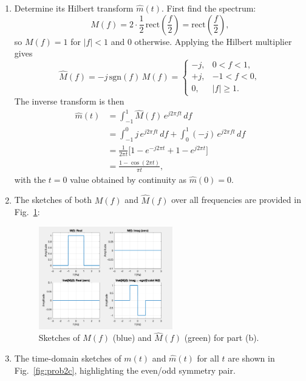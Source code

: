 \documentclass[12pt]{article}
\begin{document}
\begin{enumerate}[label=(\alph*)]
\item Determine its Hilbert transform \(\hat{m}(t)\). First find the spectrum:
\[
M(f) = 2 \cdot \frac{1}{2}\,\mathrm{rect}\!\left(\frac{f}{2}\right) = \mathrm{rect}\!\left(\frac{f}{2}\right),
\]
so \(M(f)=1\) for \(|f|<1\) and \(0\) otherwise. Applying the Hilbert multiplier gives
\[
\hat{M}(f) = -j\,\mathrm{sgn}(f)\,M(f) = 
\begin{cases}
-j, & 0 < f < 1, \\
+j, & -1 < f < 0, \\
0, & |f| \ge 1 .
\end{cases}
\]
The inverse transform is then
\begin{align*}
\hat{m}(t) &= \int_{-1}^{1} \hat{M}(f)\,e^{j2\pi ft}\,df \\
&= \int_{-1}^{0} j\,e^{j2\pi ft}\,df + \int_{0}^{1} (-j)\,e^{j2\pi ft}\,df \\
&= \frac{1}{2\pi t}\Big[1 - e^{-j2\pi t} + 1 - e^{j2\pi t}\Big] \\
&= \frac{1 - \cos(2\pi t)}{\pi t},
\end{align*}
with the \(t=0\) value obtained by continuity as \(\hat{m}(0)=0\).

\item The sketches of both \(M(f)\) and \(\hat{M}(f)\) over all frequencies are provided in Fig.~\ref{fig:prob2b}:

\begin{figure}[H]
\centering
\includegraphics[width=0.55\textwidth]{images/Question2/2b.png}
\caption{Sketches of \(M(f)\) (blue) and \(\hat{M}(f)\) (green) for part (b).}
\label{fig:prob2b}
\end{figure}

\item The time-domain sketches of \(m(t)\) and \(\hat{m}(t)\) for all \(t\) are shown in Fig.~\ref{fig:prob2c}, highlighting the even/odd symmetry pair.


\end{enumerate}
\end{document}
